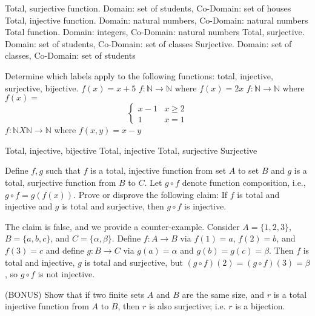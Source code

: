 \documentclass[solution, letterpaper]{cs20inclass}
\begin{document}
\begin{solution}
\subsolution Total, surjective function. Domain: set of students, Co-Domain: set of houses
\subsolution Total, injective function. Domain: natural numbers, Co-Domain: natural numbers
\subsolution Total function. Domain: integers, Co-Domain: natural numbers
\subsolution Total, surjective. Domain: set of students, Co-Domain: set of classes
\subsolution Surjective. Domain: set of classes, Co-Domain: set of students
\end{solution}

\problem Determine which labels apply to the following functions: total, injective, surjective, bijective.
\subproblem $f(x) = x + 5$
\subproblem $f : \mathds{N} \rightarrow \mathds{N}$ where $f(x) = 2x$
\subproblem  $f : \mathds{N} \rightarrow \mathds{N}$ where
$f(x) =$
\[ \begin{cases} 
      x-1 & x \geq 2 \\
      1 & x = 1
   \end{cases}
\]
\subproblem $f : \mathds{N} X \mathds{N} \rightarrow \mathds{N}$ where $f(x, y) = x - y$

\begin{solution}
\subsolution Total, injective, bijective
\subsolution Total, injective
\subsolution Total, surjective
\subsolution Surjective
\end{solution}

\problem Define $f, g$ such that $f$ is a total, injective function from set $A$ to set $B$ and $g$ is a total, surjective function from $B$ to $C$. Let $g \circ f$ denote function composition, i.e., $g \circ f=g(f(x))$. Prove or disprove the following claim: If $f$ is total and injective and $g$ is total and surjective, then $g \circ f$ is injective.

\begin{solution}
The claim is false, and we provide a counter-example. Consider $A=\{1,2,3\}$, $B=\{a, b, c\}$, and $C=\{\alpha, \beta\}$. Define $f: A \rightarrow B$ via $f(1)=a$, $f(2)=b$, and $f(3)=c$ and define $g: B \rightarrow C$ via $g(a)=\alpha$ and $g(b)=g(c)=\beta$. Then $f$ is total and injective, $g$ is total and surjective, but $(g \circ f)(2) = (g \circ f)(3) = \beta$, so $g \circ f$ is not injective.
\end{solution}


\problem (BONUS) Show that if two finite sets $A$ and $B$ are the same size, and $r$ is a total injective function from $A$ to $B$, then $r$ is also surjective; i.e. $r$ is a bijection.
\end{document}
